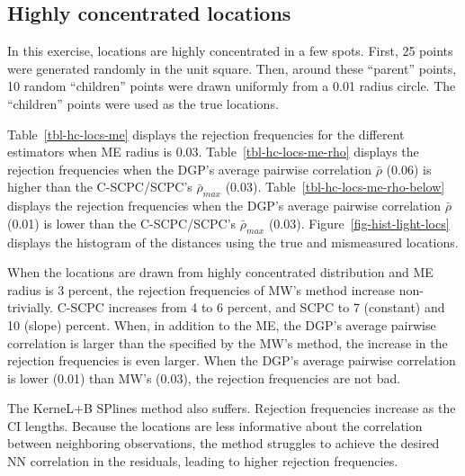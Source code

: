 \documentclass[
]{article}
\begin{document}
\hypertarget{sec-high-concentrated-locs}{%
\subsection{Highly concentrated
locations}\label{sec-high-concentrated-locs}}

In this exercise, locations are highly concentrated in a few spots.
First, 25 points were generated randomly in the unit square. Then,
around these ``parent'' points, 10 random ``children'' points were drawn
uniformly from a 0.01 radius circle. The ``children'' points were used
as the true locations.

Table~\ref{tbl-hc-locs-me} displays the rejection frequencies for the
different estimators when ME radius is 0.03.
Table~\ref{tbl-hc-locs-me-rho} displays the rejection frequencies when
the DGP's average pairwise correlation \(\bar\rho\) (0.06) is higher
than the C-SCPC/SCPC's \(\bar\rho_{max}\) (0.03).
Table~\ref{tbl-hc-locs-me-rho-below} displays the rejection frequencies
when the DGP's average pairwise correlation \(\bar\rho\) (0.01) is lower
than the C-SCPC/SCPC's \(\bar\rho_{max}\) (0.03).
Figure~\ref{fig-hist-light-locs} displays the histogram of the distances
using the true and mismeasured locations.

When the locations are drawn from highly concentrated distribution and
ME radius is 3 percent, the rejection frequencies of MW's method
increase non-trivially. C-SCPC increases from 4 to 6 percent, and SCPC
to 7 (constant) and 10 (slope) percent. When, in addition to the ME, the
DGP's average pairwise correlation is larger than the specified by the
MW's method, the increase in the rejection frequencies is even larger.
When the DGP's average pairwise correlation is lower (0.01) than MW's
(0.03), the rejection frequencies are not bad.

The KerneL+B SPlines method also suffers. Rejection frequencies increase
as the CI lengths. Because the locations are less informative about the
correlation between neighboring observations, the method struggles to
achieve the desired NN correlation in the residuals, leading to higher
rejection frequencies.
\end{document}
